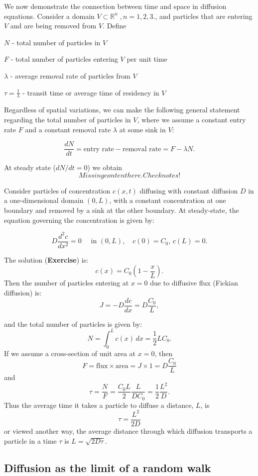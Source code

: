 \documentclass[
  letterpaper,
  DIV=11,
  numbers=noendperiod]{scrreprt}
\theoremstyle{plain}
\theoremstyle{definition}
\theoremstyle{plain}
\theoremstyle{remark}
\begin{document}
We now demonstrate the connection between time and space in diffusion
equations. Consider a domain \(V \subset \mathbb R^n \;, n = 1,2,3.\),
and particles that are entering \(V\) and are being removed from \(V\).
Define

\(N\) - total number of particles in \(V\)

\(F\) - total number of particles entering \(V\) per unit time

\(\lambda\) - average removal rate of particles from \(V\)

\(\tau = \frac 1\lambda\) - transit time or average time of residency in
\(V\)

Regardless of spatial variations, we can make the following general
statement regarding the total number of particles in \(V\), where we
assume a constant entry rate \(F\) and a constant removal rate
\(\lambda\) at some sink in \(V\):

\[
\frac{dN}{dt} = \text{entry rate} - \text{removal rate} = F - \lambda N.
\]

At steady state (\(dN/dt = 0\)) we obtain \[
Missing content here. Check notes!
\]

Consider particles of concentration \(c(x,t)\) diffusing with constant
diffusion \(D\) in a one-dimensional domain \((0,L)\), with a constant
concentration at one boundary and removed by a sink at the other
boundary. At steady-state, the equation governing the concentration is
given by:

\[
D \frac{ d^2 c}{dx^2} = 0  \quad \text{ in } (0,L), \quad c(0) = C_0, \, c(L) = 0 .
\]

The solution (\textbf{Exercise}) is: \[
c(x) = C_0 \left( 1- \frac x L\right).
\] Then the number of particles entering at \(x=0\) due to diffusive
flux (Fickian diffusion) is: \[
J = - D \frac{ dc}{ dx} = D \frac{ C_0} L,  
\]

and the total number of particles is given by: \[
N = \int_0^L c(x) \, dx = \frac 12 L C_0 .
\] If we assume a cross-section of unit area at \(x=0\), then \[
F = \text{flux}\times\text{area} = J\times 1 = D \frac{ C_0} L
\] and \[
\tau =  \frac N F = \frac { C_0 L}{2} \frac L{ DC_0} = \frac 12 \frac{L^2}{D}.
\] Thus the average time it takes a particle to diffuse a distance,
\(L\), is \[
\tau = \dfrac{L^2}{2D}
\] or viewed another way, the average distance through which diffusion
transports a particle in a time \(\tau\) is \(L= \sqrt{ 2D\tau}\).

\hypertarget{diffusion-as-the-limit-of-a-random-walk}{%
\subsection{Diffusion as the limit of a random
walk}\label{diffusion-as-the-limit-of-a-random-walk}}
\end{document}
